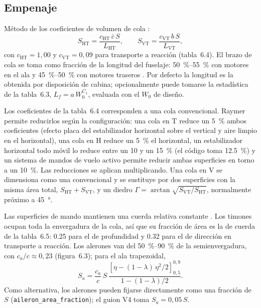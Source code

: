 \documentclass[11pt,a4paper]{article}
\begin{document}
\subsection{Empenaje}
Método de los coeficientes de volumen de cola
\cite[ecs.~6.28--6.29]{raymer6}:
\begin{equation}
  S_\text{HT} = \frac{c_\text{HT}\,\bar{c}\,S}{L_\text{HT}}, \qquad
  S_\text{VT} = \frac{c_\text{VT}\,b\,S}{L_\text{VT}},
\end{equation}
con $c_\text{HT}=1{,}00$ y $c_\text{VT}=0{,}09$ para transporte a reacción
(tabla~6.4). El brazo de cola se toma como fracción de la longitud del
fuselaje: \SIrange{50}{55}{\percent} con motores en el ala y
\SIrange{45}{50}{\percent} con motores traseros \cite[cap.~6]{raymer6}.
Por defecto la longitud es la obtenida por disposición de cabina; opcionalmente
puede tomarse la estadística de la tabla~6.3, $L_f = a\,W_0^{C_1}$, evaluada
con el $W_0$ de diseño.

Los coeficientes de la tabla~6.4 corresponden a una cola convencional. Raymer
\cite[sec.~6.4]{raymer6} permite reducirlos según la configuración: una cola en
T reduce un \SI{5}{\percent} ambos coeficientes (efecto placa del
estabilizador horizontal sobre el vertical y aire limpio en el horizontal),
una cola en H reduce un \SI{5}{\percent} el horizontal, un estabilizador
horizontal todo móvil lo reduce entre un 10 y un \SI{15}{\percent} (el código
toma \SI{12.5}{\percent}) y un sistema de mandos de vuelo activo permite
reducir ambas superficies en torno a un \SI{10}{\percent}. Las reducciones se
aplican multiplicando. Una cola en V se dimensiona como una convencional y se
sustituye por dos superficies con la misma área total, $S_\text{HT} +
S_\text{VT}$, y un diedro $\Gamma = \arctan\sqrt{S_\text{VT}/S_\text{HT}}$,
normalmente próximo a \SI{45}{\degree}.

Las superficies de mando mantienen una cuerda relativa constante
\cite[sec.~6.6]{raymer6}. Los timones ocupan toda la envergadura de la cola, así
que su fracción de área es la de cuerda de la tabla~6.5: \num{0.25} para el de
profundidad y \num{0.32} para el de dirección en transporte a reacción. Los
alerones van del \SIrange{50}{90}{\percent} de la semienvergadura, con
$c_a/c \approx 0{,}23$ (figura~6.3); para el ala trapezoidal,
\begin{equation}
  S_a = \frac{c_a}{c}\,S\,
  \frac{\left[\eta - (1-\lambda)\,\eta^2/2\right]_{0{,}5}^{0{,}9}}{1-(1-\lambda)/2} .
\end{equation}
Como alternativa, los alerones pueden fijarse directamente como una fracción
de $S$ (\texttt{aileron\_area\_fraction}); el guion V4 toma
$S_a = 0{,}05\,S$.
\end{document}
